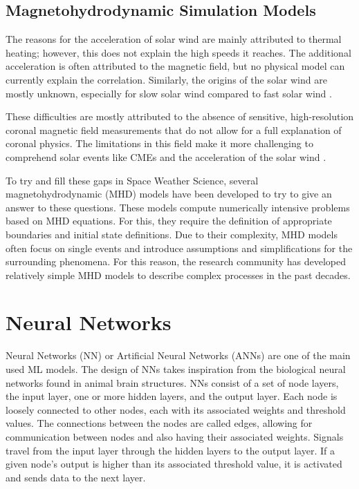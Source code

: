 \subsection{Magnetohydrodynamic Simulation Models}\label{sec:back_mhd_sim}
The reasons for the acceleration of solar wind are mainly attributed to thermal heating; however, this does not explain the high speeds it reaches. The additional acceleration is often attributed to the magnetic field, but no physical model can currently explain the correlation. Similarly, the origins of the solar wind are mostly unknown, especially for slow solar wind compared to fast solar wind \cite{priest_2014}.

These difficulties are mostly attributed to the absence of sensitive, high-resolution coronal magnetic field measurements that do not allow for a full explanation of coronal physics. The limitations in this field make it more challenging to comprehend solar events like CMEs and the acceleration of the solar wind \cite{solanki.etal_SolarMagneticField_2006}.

To try and fill these gaps in Space Weather Science, several magnetohydrodynamic (MHD) models have been developed to try to give an answer to these questions. These models compute numerically intensive problems based on MHD equations. For this, they require the definition of appropriate boundaries and initial state definitions. Due to their complexity, MHD models often focus on single events and introduce assumptions and simplifications for the surrounding phenomena. For this reason, the research community has developed relatively simple MHD models to describe complex processes in the past decades.

\section{Neural Networks}\label{sec:nn}
Neural Networks (NN) or Artificial Neural Networks (ANNs) are one of the main used ML models. The design of NNs takes inspiration from the biological neural networks found in animal brain structures. NNs consist of a set of node layers, the input layer, one or more hidden layers, and the output layer. Each node is loosely connected to other nodes, each with its associated weights and threshold values. The connections between the nodes are called edges, allowing for communication between nodes and also having their associated weights. Signals travel from the input layer through the hidden layers to the output layer. If a given node's output is higher than its associated threshold value, it is activated and sends data to the next layer.

